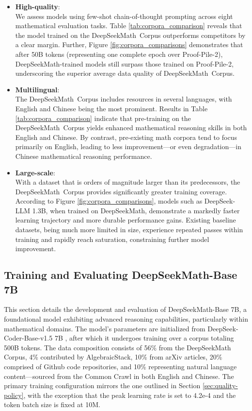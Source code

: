 \begin{itemize}[topsep=0pt]
    \item \textbf{High-quality}:\\
    We assess models using few-shot chain-of-thought prompting \cite{cot} across eight mathematical evaluation tasks. Table \ref{tab:corpora_comparison} reveals that the model trained on the DeepSeekMath~Corpus outperforms competitors by a clear margin. Further, Figure \ref{fig:corpora_comparisons} demonstrates that after 50B tokens (representing one complete epoch over Proof-Pile-2), DeepSeekMath-trained models still surpass those trained on Proof-Pile-2, underscoring the superior average data quality of DeepSeekMath~Corpus.
    \item \textbf{Multilingual}:\\
    The DeepSeekMath~Corpus includes resources in several languages, with English and Chinese being the most prominent. Results in Table \ref{tab:corpora_comparison} indicate that pre-training on the DeepSeekMath~Corpus yields enhanced mathematical reasoning skills in both English and Chinese. By contrast, pre-existing math corpora tend to focus primarily on English, leading to less improvement—or even degradation—in Chinese mathematical reasoning performance.
    \item \textbf{Large-scale}:\\
    With a dataset that is orders of magnitude larger than its predecessors, the DeepSeekMath~Corpus provides significantly greater training coverage. According to Figure \ref{fig:corpora_comparisons}, models such as DeepSeek-LLM 1.3B, when trained on DeepSeekMath, demonstrate a markedly faster learning trajectory and more durable performance gains. Existing baseline datasets, being much more limited in size, experience repeated passes within training and rapidly reach saturation, constraining further model improvement.
\end{itemize}

\subsection{Training and Evaluating DeepSeekMath-Base 7B}

This section details the development and evaluation of DeepSeekMath-Base 7B, a foundational model exhibiting advanced reasoning capabilities, particularly within mathematical domains. The model's parameters are initialized from DeepSeek-Coder-Base-v1.5 7B \citep{deepseek-coder}, after which it undergoes training over a corpus totaling 500B tokens. The data composition consists of 56\% from the DeepSeekMath Corpus, 4\% contributed by AlgebraicStack, 10\% from arXiv articles, 20\% comprised of Github code repositories, and 10\% representing natural language content—sourced from the Common Crawl in both English and Chinese. The primary training configuration mirrors the one outlined in Section \ref{sec:quality-policy}, with the exception that the peak learning rate is set to 4.2e-4 and the token batch size is fixed at 10M.

